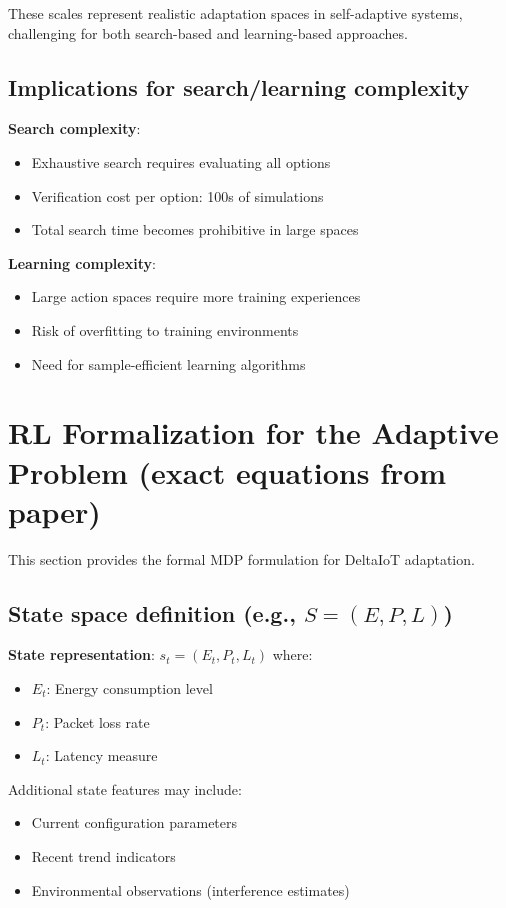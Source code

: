 \documentclass[11pt,a4paper]{article}
\begin{document}
These scales represent realistic adaptation spaces in self-adaptive systems, challenging for both search-based and learning-based approaches.

\subsection{Implications for search/learning complexity}

\textbf{Search complexity}:
\begin{itemize}
    \item Exhaustive search requires evaluating all options
    \item Verification cost per option: 100s of simulations
    \item Total search time becomes prohibitive in large spaces
\end{itemize}

\textbf{Learning complexity}:
\begin{itemize}
    \item Large action spaces require more training experiences
    \item Risk of overfitting to training environments
    \item Need for sample-efficient learning algorithms
\end{itemize}

\section{RL Formalization for the Adaptive Problem (exact equations from paper)}

This section provides the formal MDP formulation for DeltaIoT adaptation.

\subsection{State space definition (e.g., $S = (E, P, L)$)}

\textbf{State representation}: $s_t = (E_t, P_t, L_t)$ where:
\begin{itemize}
    \item $E_t$: Energy consumption level
    \item $P_t$: Packet loss rate
    \item $L_t$: Latency measure
\end{itemize}

Additional state features may include:
\begin{itemize}
    \item Current configuration parameters
    \item Recent trend indicators
    \item Environmental observations (interference estimates)
\end{itemize}
\end{document}
